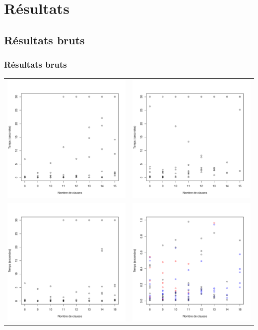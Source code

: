 \documentclass{beamer}
\begin{document}
\section{Résultats}
\subsection{Résultats bruts}
\begin{frame}
    \frametitle{Résultats bruts}
    \begin{center}
        \begin{tabular}{cc}
            \includegraphics[width=0.35\linewidth]{data/scat1.pdf} & \includegraphics[width=0.35\linewidth]{data/scat2.pdf} \\
            \includegraphics[width=0.35\linewidth]{data/scat4.pdf} & \includegraphics[width=0.35\linewidth]{data/small.pdf} \\
        \end{tabular}
    \end{center}
\end{frame}
\end{document}
